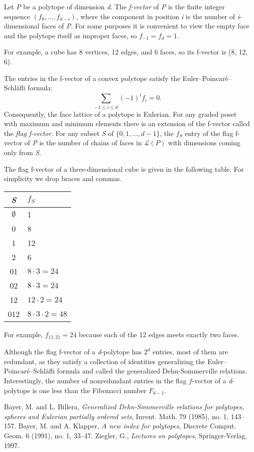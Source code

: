 \documentclass[12pt]{article}
\newcommand{\fm}[1]{{\it #1}}
\begin{document}
Let \fm{P} be a polytope of dimension \fm{d}.  The \emph{f-vector} of
\fm{P} is the finite integer sequence $(f_0, \dots, f_{d-i})$, where
the component in position \fm{i} is the number of \fm{i}-dimensional
faces of \fm{P}.  For some purposes it is convenient to view the empty
face and the polytope itself as improper faces, so $f_{-1} = f_d = 1$.

For example, a cube has 8 vertices, 12 edges, and 6 faces, so its
f-vector is (8, 12, 6).

The entries in the f-vector of a convex polytope satisfy the 
Euler--Poincar\'e--Schl\"afli formula:
\begin{equation*}
\sum_{-1\le i\le d}(-1)^i f_i=0.
\end{equation*}
Consequently, the face lattice of a polytope is Eulerian. For any
graded poset with maximum and minimum elements there is an extension
of the f-vector called the \emph{flag f-vector}.  For any subset
\fm{S} of $\{0,1,\dots,d - 1\}$, the $f_S$ entry of the flag
f-vector of \fm{P} is the number of chains of faces in
$\mathcal{L}(P)$ with dimensions coming only from \fm{S}.

The flag f-vector of a three-dimensional cube is given in the
following table.  For simplicity we drop braces and commas.
\begin{center}
\begin{tabular}{cl}
\fm{S} & $f_S$ \\
\hline
$\emptyset$ & 1  \\
0           & 8  \\
1           & 12 \\
2           & 6  \\
01          & $8\cdot 3 = 24$ \\
02          & $8\cdot 3 = 24$ \\
12          & $12\cdot 2 = 24$ \\
012         & $8\cdot 3\cdot 2 = 48$
\end{tabular}
\end{center}
For example, $f_{\{1,2\}}=24$ because each of the 12 edges
meets exactly two faces.

Although the flag f-vector of a \fm{d}-polytope has $2^d$ entries,
most of them are redundant, as they satisfy a collection of identities
generalizing the Euler--Poincar\'e--Schl\"afli formula and called the
generalized Dehn-Sommerville relations. Interestingly, the number of
nonredundant entries in the flag $f$-vector of a \fm{d}-polytope is
one less than the Fibonacci number $F_{d-1}$.

\begin{thebibliography}{3}
Bayer, M. and L. Billera, \emph{Generalized Dehn-Sommerville relations for
polytopes, spheres and Eulerian partially ordered sets}, Invent. Math. 79
(1985), no. 1, 143--157.
Bayer, M. and A. Klapper, \emph{A new index for polytopes}, Discrete Comput.
Geom. 6
(1991), no. 1, 33--47.
Ziegler, G., \emph{Lectures on polytopes}, Springer-Verlag, 1997.
\end{thebibliography}

\end{document}
